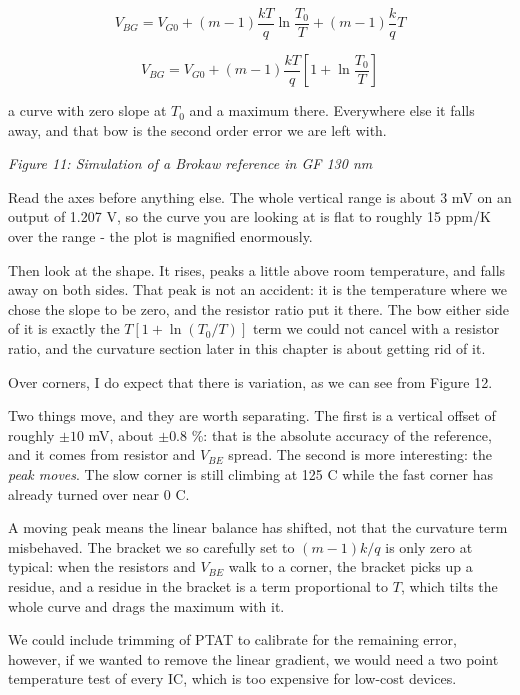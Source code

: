 \[ V_{BG} = V_{G0} + (m-1)\frac{kT}{q}\ln{\frac{T_0}{T}} + (m-1)\frac{k}{q}T \]

\[ V_{BG} = V_{G0} + (m-1)\frac{kT}{q}\left[1 + \ln{\frac{T_0}{T}}\right] \]

a curve with zero slope at \(T_0\) and a maximum there. Everywhere else
it falls away, and that bow is the second order error we are left with.


{
\centering
{}
}

\emph{Figure 11: Simulation of a Brokaw reference in GF 130 nm}

Read the axes before anything else. The whole vertical range is about 3
mV on an output of 1.207 V, so the curve you are looking at is flat to
roughly 15 ppm/K over the range - the plot is magnified enormously.

Then look at the shape. It rises, peaks a little above room temperature,
and falls away on both sides. That peak is not an accident: it is the
temperature where we chose the slope to be zero, and the resistor ratio
put it there. The bow either side of it is exactly the
\(T\left[1 + \ln{(T_0/T)}\right]\) term we could not cancel with a
resistor ratio, and the curvature section later in this chapter is about
getting rid of it.

Over corners, I do expect that there is variation, as we can see from
Figure 12.

Two things move, and they are worth separating. The first is a vertical
offset of roughly \(\pm 10\) mV, about \(\pm 0.8\) \%: that is the
absolute accuracy of the reference, and it comes from resistor and
\(V_{BE}\) spread. The second is more interesting: the \emph{peak
moves}. The slow corner is still climbing at 125 C while the fast corner
has already turned over near 0 C.

A moving peak means the linear balance has shifted, not that the
curvature term misbehaved. The bracket we so carefully set to
\((m-1)k/q\) is only zero at typical: when the resistors and \(V_{BE}\)
walk to a corner, the bracket picks up a residue, and a residue in the
bracket is a term proportional to \(T\), which tilts the whole curve and
drags the maximum with it.

We could include trimming of PTAT to calibrate for the remaining error,
however, if we wanted to remove the linear gradient, we would need a two
point temperature test of every IC, which is too expensive for low-cost
devices.


{
\centering
{}
}

